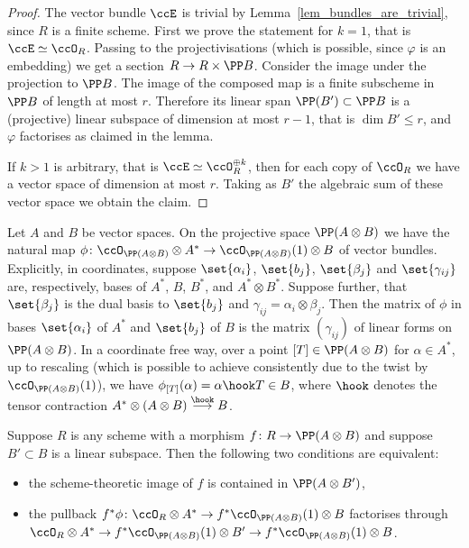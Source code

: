 \documentclass[12pt,a4paper]{article}
\begin{document}
\begin{proof}
   The vector bundle $\ccE$ is trivial by Lemma~\ref{lem_bundles_are_trivial}, since $R$ is a finite scheme.
   First we prove the statement for $k=1$, that is $\ccE \simeq \ccO_R$.
   Passing to the projectivisations (which is possible, since $\varphi$ is an embedding) we get a section $R \to R \times \PP B$.
   Consider the image under the projection to $\PP B$.
   The image of the composed map is a finite subscheme in $\PP B$ of length at most $r$.
   Therefore its linear span $\PP (B') \subset \PP B$ is a (projective) linear subspace of dimension at most $r-1$, that is $\dim B'\le r$,
      and $\varphi$ factorises as claimed in the lemma.

   If $k>1$ is arbitrary, that is $\ccE\simeq \ccO_R^{\oplus k}$, then for each copy of $\ccO_R$ we have a vector space of dimension at most $r$.
   Taking as $B'$ the algebraic sum of these vector space we obtain the claim.
\end{proof}

Let $A$ and $B$ be vector spaces.
On the projective space $\PP(A\otimes B)$ we have the natural map
     $\phi\colon\ccO_{\PP (A\otimes B)} \otimes A^* \to \ccO_{\PP (A\otimes B)}(1) \otimes B$
     of vector bundles.
Explicitly, in coordinates, suppose $\set{\alpha_i}$, $\set{b_j}$, $\set{\beta_j}$ and $\set{\gamma_{ij}}$ are,  respectively, bases of $A^*$, $B$, $B^*$, and $A^*\otimes B^*$.
Suppose further, that $\set{\beta_j}$
  is the dual basis to $\set{b_j}$
  and $\gamma_{ij}= \alpha_i\otimes \beta_j$.
Then the matrix of $\phi$ in bases
$\set{\alpha_i}$ of $A^*$ and $\set{b_j}$ of $B$ is the matrix $(\gamma_{ij})$ of linear forms on $\PP(A\otimes B)$.
In a coordinate free way,
  over a point $[T]\in\PP(A\otimes B)$ for $\alpha\in A^*$,
  up to rescaling
  (which is possible to achieve consistently due to the twist by
    $\ccO_{\PP(A\otimes B)}(1)$),
  we have $\phi_{[T]}(\alpha) = \alpha \hook T \in B$,
  where $\hook$ denotes the tensor contraction
    $A^*\otimes (A\otimes B) \stackrel{\hook}{\longrightarrow} B$.





\begin{lemma}\label{lem_PAotimesBprime}
    Suppose $R$ is any scheme with a morphism  $f \colon R\to \PP(A\otimes B)$ and suppose $B' \subset B$ is a linear subspace.
    Then the following two conditions are equivalent:
    \begin{itemize}
      \item  the scheme-theoretic image of $f$ is contained in $\PP(A \otimes B')$,
      \item the pullback  $f^*\phi \colon \ccO_{R} \otimes A^* \to f^*\ccO_{\PP (A\otimes B)}(1) \otimes B$
            factorises through
            $\ccO_{R} \otimes A^* \to f^*\ccO_{\PP (A\otimes B)}(1) \otimes B'  \to   f^*\ccO_{\PP (A\otimes B)}(1) \otimes B$.
    \end{itemize}
\end{lemma}
\end{document}

